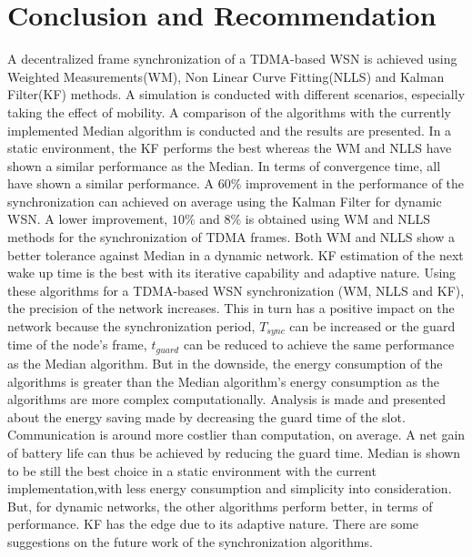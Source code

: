 \documentclass[journal]{IEEEtran}
\begin{document}
\section{\textbf{Conclusion and Recommendation}}\noindent
A decentralized frame synchronization of a TDMA-based WSN is achieved
using Weighted Measurements(WM), Non Linear Curve Fitting(NLLS) and
Kalman Filter(KF) methods. A simulation is conducted with different scenarios, especially
taking the effect of mobility. A comparison of the algorithms with the currently implemented Median algorithm
is conducted and the results are presented.
\newline
In a static environment, the KF performs the best whereas the WM and NLLS have shown a similar performance as the
Median. In terms of convergence time, all have shown a similar performance.
\newline
A $60\%$ improvement in the performance of the synchronization can
achieved on average using the Kalman Filter for dynamic WSN. A lower
improvement, $10\%$ and $8\%$ is obtained using WM and NLLS methods
for the synchronization of TDMA frames. Both WM and NLLS show a better tolerance
against Median in a dynamic network. KF estimation of
the next wake up time is the best with its iterative capability and
adaptive nature.
\newline
Using these algorithms for a TDMA-based WSN synchronization (WM, NLLS and KF), the precision of the network increases. This in turn has a positive impact on the network because the synchronization period, $T_{sync}$ can be increased or the guard time of the node's frame, $t_{guard}$ can be reduced to achieve the same performance as the
Median algorithm. 
\newline
But in the downside, the energy consumption of the algorithms is
greater than the Median algorithm's energy consumption as the algorithms are more complex computationally. Analysis is made and presented about the
energy saving made by decreasing the guard time of the slot. 
Communication is around more costlier than computation, on average. A net gain of battery life can thus be achieved by reducing the guard time.
\newline
Median is shown to be still the best choice in a static environment with the current implementation,with less energy consumption and simplicity into consideration. But, for dynamic networks, the other algorithms perform better, in terms of
performance. KF has the edge due to its adaptive nature.
\newline 
\noindent There are some suggestions on the future work of the synchronization algorithms.
\end{document}
